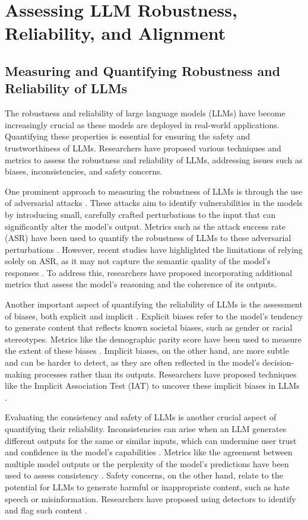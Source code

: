 \documentclass[11pt]{article}
\begin{document}
\section{Assessing LLM Robustness, Reliability, and Alignment}

\subsection{Measuring and Quantifying Robustness and Reliability of LLMs}

The robustness and reliability of large language models (LLMs) have become increasingly crucial as these models are deployed in real-world applications. Quantifying these properties is essential for ensuring the safety and trustworthiness of LLMs. Researchers have proposed various techniques and metrics to assess the robustness and reliability of LLMs, addressing issues such as biases, inconsistencies, and safety concerns.

One prominent approach to measuring the robustness of LLMs is through the use of adversarial attacks \cite{ref148}. These attacks aim to identify vulnerabilities in the models by introducing small, carefully crafted perturbations to the input that can significantly alter the model's output. Metrics such as the attack success rate (ASR) have been used to quantify the robustness of LLMs to these adversarial perturbations \cite{ref149}. However, recent studies have highlighted the limitations of relying solely on ASR, as it may not capture the semantic quality of the model's responses \cite{ref150}. To address this, researchers have proposed incorporating additional metrics that assess the model's reasoning and the coherence of its outputs.

Another important aspect of quantifying the reliability of LLMs is the assessment of biases, both explicit and implicit \cite{ref151,ref152}. Explicit biases refer to the model's tendency to generate content that reflects known societal biases, such as gender or racial stereotypes. Metrics like the demographic parity score have been used to measure the extent of these biases \cite{ref153}. Implicit biases, on the other hand, are more subtle and can be harder to detect, as they are often reflected in the model's decision-making processes rather than its outputs. Researchers have proposed techniques like the Implicit Association Test (IAT) to uncover these implicit biases in LLMs \cite{ref152}.

Evaluating the consistency and safety of LLMs is another crucial aspect of quantifying their reliability. Inconsistencies can arise when an LLM generates different outputs for the same or similar inputs, which can undermine user trust and confidence in the model's capabilities \cite{ref154}. Metrics like the agreement between multiple model outputs or the perplexity of the model's predictions have been used to assess consistency \cite{ref155}. Safety concerns, on the other hand, relate to the potential for LLMs to generate harmful or inappropriate content, such as hate speech or misinformation. Researchers have proposed using detectors to identify and flag such content \cite{ref156}.
\end{document}
